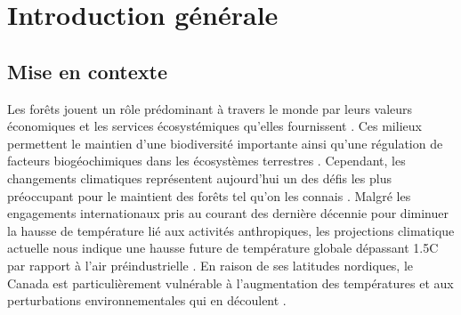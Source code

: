 \chapter*{Introduction générale}         %
\label{chap-introduction}       %

\section*{Mise en contexte}
\label{sec:contexte}

Les forêts jouent un rôle prédominant à travers le monde par leurs valeurs économiques et les services écosystémiques qu'elles fournissent \citep{Balvanera2006Quantifyingevidence}.
Ces milieux permettent le maintien d’une biodiversité importante ainsi qu'une régulation de facteurs biogéochimiques dans les écosystèmes terrestres \citep{Pawson2013Plantationforests}. 
Cependant, les changements climatiques représentent aujourd'hui un des défis les plus préoccupant pour le maintient des forêts tel qu'on les connais \citep{McKenney2009Climatechange,Messier2022Warningnatural,Seidl2017Forestdisturbances,Trumbore2015Foresthealth}.  
Malgré les engagements internationaux pris au courant des dernière décennie pour diminuer la hausse de température lié aux activités anthropiques, 
les projections climatique actuelle nous indique une hausse future de température globale dépassant 1.5C par rapport à l'air préindustrielle \citep{Matthews2022Currentglobal}.
En raison de ses latitudes nordiques, le Canada est particulièrement vulnérable à l'augmentation des températures et aux perturbations environnementales qui en découlent \citep{Alo2008Potentialfuture,Bush2019Canadachanging}. 

